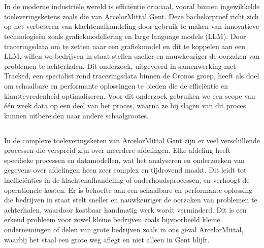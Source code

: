 
\chapter{}%
\label{ch:inleiding}

In de moderne industriële wereld is efficiëntie cruciaal, vooral binnen ingewikkelde toeleveringsketens zoals die van ArcelorMittal Gent. 
Deze bachelorproef richt zich op het verbeteren van klachtenafhandeling door gebruik te maken van innovatieve technologieën zoals grafiekmodellering en large language models (LLM). 
Door traceringsdata om te zetten naar een grafiekmodel en dit te koppelen aan een LLM, willen we bedrijven in staat stellen sneller en nauwkeuriger de oorzaken van problemen te achterhalen. 
Dit onderzoek, uitgevoerd in samenwerking met Tracked, een specialist rond traceringsdata binnen de Cronos groep, heeft als doel om schaalbare en performante oplossingen te bieden die de efficiëntie en klanttevredenheid optimaliseren.
Voor dit onderzoek gebruiken we een scope van één week data op een deel van het proces, waarna ze bij slagen van dit proces kunnen uitbereiden naar andere schaalgrootes.

\section{}%
\label{sec:probleemstelling}

In de complexe toeleveringsketen van ArcelorMittal Gent zijn er veel verschillende processen die verspreid zijn over meerdere afdelingen. 
Elke afdeling heeft specifieke processen en datamodellen, wat het analyseren en onderzoeken van gegevens over afdelingen heen zeer complex en tijdrovend maakt. 
Dit leidt tot inefficiënties in de klachtenafhandeling of onderhoudsprocessen, en verhoogt de operationele kosten. 
Er is behoefte aan een schaalbare en performante oplossing die bedrijven in staat stelt sneller en nauwkeuriger de oorzaken van problemen te achterhalen, waardoor kostbaar handmatig werk wordt verminderd.
Dit is een erkend probleem voor zowel kleine bedrijven zoals bijvoorbeeld kleine ondernemingen of delen van grote bedrijven zoals in ons geval ArcelorMittal, waarbij het staal een grote weg aflegt en niet alleen in Gent blijft.

